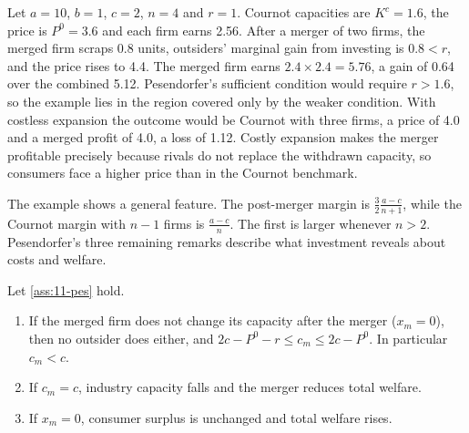\begin{example}\label{ex:11-pes}
Let $a = 10$, $b = 1$, $c = 2$, $n = 4$ and $r = 1$. Cournot capacities are $K^c = 1.6$, the price is $P^0 = 3.6$ and
each firm earns 2.56. After a merger of two firms, the merged firm scraps 0.8 units, outsiders' marginal gain from
investing is $0.8 < r$, and the price rises to 4.4. The merged firm earns $2.4 \times 2.4 = 5.76$, a gain of 0.64 over
the combined 5.12. Pesendorfer's sufficient condition would require $r > 1.6$, so the example lies in the region
covered only by the weaker condition. With costless expansion the outcome would be Cournot with three firms, a price of
4.0 and a merged profit of 4.0, a loss of 1.12. Costly expansion makes the merger profitable precisely because rivals
do not replace the withdrawn capacity, so consumers face a higher price than in the Cournot benchmark.
\end{example}

The example shows a general feature. The post-merger margin is $\frac{3}{2}\frac{a - c}{n + 1}$, while the Cournot
margin with $n - 1$ firms is $\frac{a - c}{n}$. The first is larger whenever $n > 2$. Pesendorfer's three remaining
remarks describe what investment reveals about costs and welfare.

\begin{proposition}\label{prop:11-pes-remarks}
Let \cref{ass:11-pes} hold.
\begin{enumerate}[label=(\alph*)]
  \item If the merged firm does not change its capacity after the merger ($x_m = 0$), then no outsider does either, and
  $2c - P^0 - r \le c_m \le 2c - P^0$. In particular $c_m < c$.
  \item If $c_m = c$, industry capacity falls and the merger reduces total welfare.
  \item If $x_m = 0$, consumer surplus is unchanged and total welfare rises.
\end{enumerate}
\end{proposition}

